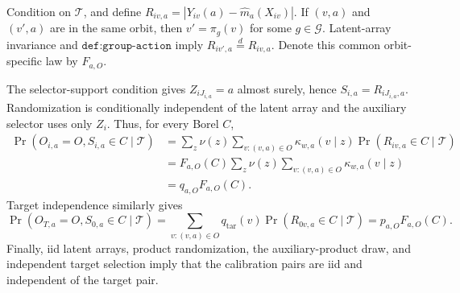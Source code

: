 Condition on \(\mathcal T\), and define \(R_{iv,a}=|Y_{iv}(a)-\widehat m_a(X_{iv})|\). If \((v,a)\) and \((v',a)\) are in the same orbit, then \(v'=\pi_g(v)\) for some \(g\in\mathcal G\). Latent-array invariance and \(\texttt{def:group-action}\) imply \(R_{iv',a}\overset d=R_{iv,a}\). Denote this common orbit-specific law by \(F_{a,O}\).

The selector-support condition gives \(Z_{iJ_{i,a}}=a\) almost surely, hence \(S_{i,a}=R_{iJ_{i,a},a}\). Randomization is conditionally independent of the latent array and the auxiliary selector uses only \(Z_i\). Thus, for every Borel \(C\), \[\begin{aligned}\Pr(O_{i,a}=O,S_{i,a}\in C\mid\mathcal T)&=\sum_z\nu(z)\sum_{v:(v,a)\in O}\kappa_{w,a}(v\mid z)\Pr(R_{iv,a}\in C\mid\mathcal T)\\&=F_{a,O}(C)\sum_z\nu(z)\sum_{v:(v,a)\in O}\kappa_{w,a}(v\mid z)\\&=q_{a,O}F_{a,O}(C).\end{aligned}\] Target independence similarly gives \[\Pr(O_{T,a}=O,S_{0,a}\in C\mid\mathcal T)=\sum_{v:(v,a)\in O}q_{\mathrm{tar}}(v)\Pr(R_{0v,a}\in C\mid\mathcal T)=p_{a,O}F_{a,O}(C).\] Finally, iid latent arrays, product randomization, the auxiliary-product draw, and independent target selection imply that the calibration pairs are iid and independent of the target pair.
